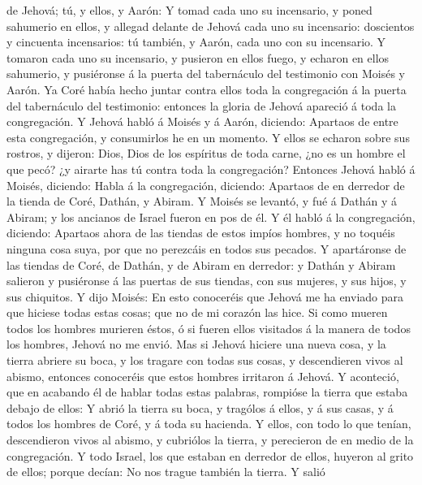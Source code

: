 de Jehová; tú, y ellos, y Aarón:  Y tomad cada uno su
incensario, y poned sahumerio en ellos, y allegad delante de Jehová cada
uno su incensario: doscientos y cincuenta incensarios: tú también, y
Aarón, cada uno con su incensario.  Y tomaron cada uno su
incensario, y pusieron en ellos fuego, y echaron en ellos sahumerio, y
pusiéronse á la puerta del tabernáculo del testimonio con Moisés y
Aarón.  Ya Coré había hecho juntar contra ellos toda la
congregación á la puerta del tabernáculo del testimonio: entonces la
gloria de Jehová apareció á toda la congregación.  Y Jehová
habló á Moisés y á Aarón, diciendo:  Apartaos de entre esta
congregación, y consumirlos he en un momento.  Y ellos se
echaron sobre sus rostros, y dijeron: Dios, Dios de los espíritus de
toda carne, ¿no es un hombre el que pecó? ¿y airarte has tú contra toda
la congregación?  Entonces Jehová habló á Moisés, diciendo:
 Habla á la congregación, diciendo: Apartaos de en derredor
de la tienda de Coré, Dathán, y Abiram.  Y Moisés se
levantó, y fué á Dathán y á Abiram; y los ancianos de Israel fueron en
pos de él.  Y él habló á la congregación, diciendo:
Apartaos ahora de las tiendas de estos impíos hombres, y no toquéis
ninguna cosa suya, por que no perezcáis en todos sus pecados.
 Y apartáronse de las tiendas de Coré, de Dathán, y de
Abiram en derredor: y Dathán y Abiram salieron y pusiéronse á las
puertas de sus tiendas, con sus mujeres, y sus hijos, y sus chiquitos.
 Y dijo Moisés: En esto conoceréis que Jehová me ha enviado
para que hiciese todas estas cosas; que no de mi corazón las hice.
 Si como mueren todos los hombres murieren éstos, ó si
fueren ellos visitados á la manera de todos los hombres, Jehová no me
envió.  Mas si Jehová hiciere una nueva cosa, y la tierra
abriere su boca, y los tragare con todas sus cosas, y descendieren vivos
al abismo, entonces conoceréis que estos hombres irritaron á Jehová.
 Y aconteció, que en acabando él de hablar todas estas
palabras, rompióse la tierra que estaba debajo de ellos:  Y
abrió la tierra su boca, y tragólos á ellos, y á sus casas, y á todos
los hombres de Coré, y á toda su hacienda.  Y ellos, con
todo lo que tenían, descendieron vivos al abismo, y cubriólos la tierra,
y perecieron de en medio de la congregación.  Y todo
Israel, los que estaban en derredor de ellos, huyeron al grito de ellos;
porque decían: No nos trague también la tierra.  Y salió

